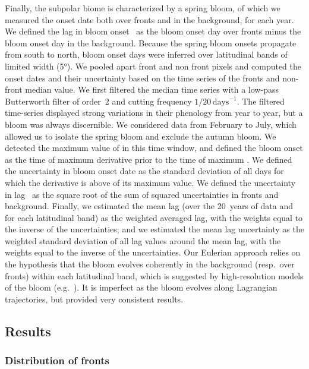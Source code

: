 Finally, the subpolar biome is characterized by a spring bloom, of which we measured the onset date both over fronts and in the background, for each year.
We defined the lag in bloom onset~ as the bloom onset day over fronts minus the bloom onset day in the background.
Because the spring bloom onsets propagate from south to north, bloom onset days were inferred over latitudinal bands of limited width (\ang{5}).
We pooled apart front and non front pixels and computed the onset dates and their uncertainty based on the time series of the fronts and non-front  median value.
We first filtered the  median time series with a low-pass Butterworth filter of order~2 and cutting frequency \(1/20\,\text{days}^{-1}\).
The filtered time-series displayed strong variations in their phenology from year to year, but a bloom was always discernible.
We considered data from February to July, which allowed us to isolate the spring bloom and exclude the autumn bloom.
We detected the maximum value of  in this time window, and defined the bloom onset as the time of maximum  derivative prior to the time of maximum .
We defined the uncertainty in bloom onset date as the standard deviation of all days for which the  derivative is above  of its maximum value.
We defined the uncertainty in lag~ as the square root of the sum of squared uncertainties in fronts and background.
Finally, we estimated the mean lag (over the 20~years of data and for each latitudinal band) as the weighted averaged lag, with the weights equal to the inverse of the uncertainties; and we estimated the mean lag uncertainty as the weighted standard deviation of all lag values around the mean lag, with the weights equal to the inverse of the uncertainties.
Our Eulerian approach relies on the hypothesis that the bloom evolves coherently in the background (resp.\ over fronts) within each latitudinal band, which is suggested by high-resolution models of the bloom (e.g.\ \cite{levy_2005a,karleskind_2011}).
It is imperfect as the bloom evolves along Lagrangian trajectories, but provided very consistent results.


\subsection{Results}

\subsubsection{Distribution of fronts}

